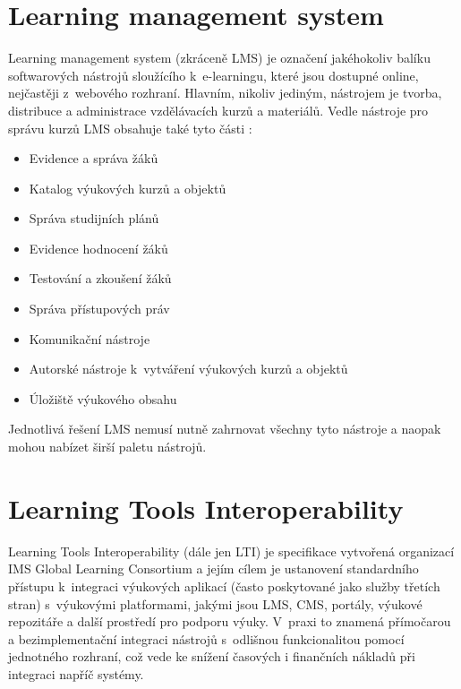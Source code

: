 \documentclass[
print,
  11pt,
  table,   
  nolof,    
  nolot,
  oneside,final
]{fithesis3}
\begin{document}
	\section{Learning management system}
Learning management system (zkráceně LMS) je označení jakéhokoliv balíku softwarových nástrojů sloužícího k~e-learningu, které jsou dostupné online, nejčastěji z~webového rozhraní. Hlavním, nikoliv jediným, nástrojem je tvorba, distribuce a administrace vzdělávacích kurzů a materiálů. Vedle nástroje pro správu kurzů LMS obsahuje také tyto části \cite{lms}:
\begin{itemize}
	\item Evidence a správa žáků
	\item Katalog výukových kurzů a objektů
	\item Správa studijních plánů
	\item Evidence hodnocení žáků
	\item Testování a zkoušení žáků
	\item Správa přístupových práv
	\item Komunikační nástroje
	\item Autorské nástroje k~vytváření výukových kurzů a objektů
	\item Úložiště výukového obsahu
\end{itemize}
Jednotlivá řešení LMS nemusí nutně zahrnovat všechny tyto nástroje a naopak mohou nabízet širší paletu nástrojů.

	\section{Learning Tools Interoperability}
Learning Tools Interoperability{\textregistered} (dále jen LTI) je specifikace vytvořená organizací IMS Global Learning Consortium a jejím cílem je ustanovení standardního přístupu k~integraci výukových aplikací (často poskytované jako služby třetích stran) s~výukovými platformami, jakými jsou LMS, CMS, portály, výukové repozitáře a další prostředí pro podporu výuky. V~praxi to znamená přímočarou a bezimplementační integraci nástrojů s~odlišnou funkcionalitou pomocí jednotného rozhraní, což vede ke snížení časových i finančních nákladů při integraci napříč systémy. \cite{imslti}
\end{document}
